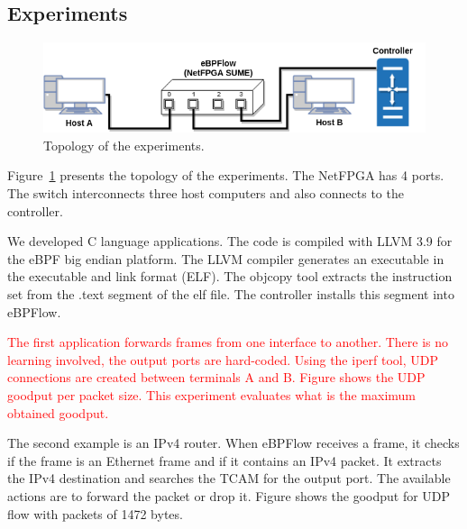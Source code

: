 \subsection{Experiments} 
\label{sec:experiments}

\begin{figure}[ht]
\centering
\includegraphics[width=1.\linewidth]{figures/07_fig03-3hosts.png}
\caption{Topology of the experiments.}
\label{fig:07_fig03}
\end{figure}


Figure~\ref{fig:07_fig03} presents the topology of the experiments. The NetFPGA has 4 ports. The switch interconnects three host computers and also connects to the controller.

We developed C language applications. The code is compiled with LLVM 3.9 for the eBPF big endian platform. The LLVM compiler generates an executable in the executable and link format (ELF). The objcopy tool extracts the instruction set from the .text segment of the elf file.
The controller installs this segment into eBPFlow.

\textcolor{red}{The first application forwards frames from one interface to another. There is no learning involved, the output ports are hard-coded. Using the iperf tool, UDP connections are created between terminals A and B. Figure %
shows the UDP goodput per packet size. This experiment evaluates what is the maximum obtained goodput.}

The second example is an IPv4 router. When eBPFlow receives a frame, it checks if the frame is an Ethernet frame and if it contains an IPv4 packet. It extracts the IPv4 destination and searches the TCAM for the output port. The available actions are to forward the packet or drop it. Figure %
shows the goodput for UDP flow with packets of 1472 bytes.

